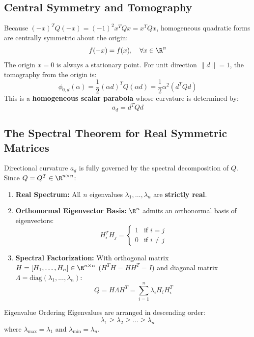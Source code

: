\subsection{Central Symmetry and Tomography}
Because $(-x)^T Q (-x) = (-1)^2 x^T Q x = x^T Q x$, homogeneous quadratic forms are centrally symmetric about the origin:
\begin{equation}
f(-x) = f(x), \quad \forall x \in \R^n
\end{equation}
The origin $x = 0$ is always a stationary point. For unit direction $\|d\| = 1$, the tomography from the origin is:
\begin{equation}
\phi_{0, d}(\alpha) = \frac{1}{2} (\alpha d)^T Q (\alpha d) = \frac{1}{2} \alpha^2 (d^T Q d)
\end{equation}
This is a \textbf{homogeneous scalar parabola} whose curvature is determined by:
\begin{equation}
a_d = d^T Q d
\end{equation}

\subsection{The Spectral Theorem for Real Symmetric Matrices}
Directional curvature $a_d$ is fully governed by the spectral decomposition of $Q$. Since $Q = Q^T \in \R^{n \times n}$:
\begin{enumerate}
    \item \textbf{Real Spectrum:} All $n$ eigenvalues $\lambda_1, \dots, \lambda_n$ are \textbf{strictly real}.
    \item \textbf{Orthonormal Eigenvector Basis:} $\R^n$ admits an orthonormal basis of eigenvectors:
    \begin{equation}
    H_i^T H_j = \begin{cases} 1 & \text{if } i = j \\ 0 & \text{if } i \neq j \end{cases}
    \end{equation}
    \item \textbf{Spectral Factorization:} With orthogonal matrix $H = [H_1, \dots, H_n] \in \R^{n \times n}$ ($H^T H = H H^T = I$) and diagonal matrix $\Lambda = \text{diag}(\lambda_1, \dots, \lambda_n)$:
    \begin{equation}
    Q = H \Lambda H^T = \sum_{i=1}^n \lambda_i H_i H_i^T
    \end{equation}
\end{enumerate}

\begin{noteblock}{Eigenvalue Ordering}
Eigenvalues are arranged in descending order:
\begin{equation}
\lambda_1 \ge \lambda_2 \ge \dots \ge \lambda_n
\end{equation}
where $\lambda_{\max} = \lambda_1$ and $\lambda_{\min} = \lambda_n$.
\end{noteblock}

